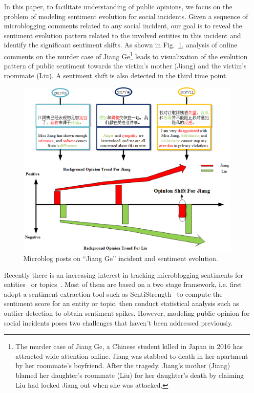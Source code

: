 \documentclass[runningheads]{llncs}
\begin{document}
In this paper, to facilitate understanding of public opinions, we focus on the problem of modeling sentiment evolution for social incidents. 
Given a sequence of microblogging comments related to any social incident, our goal is to reveal the sentiment evolution pattern related to the involved entities in this incident and identify the significant sentiment shifts. 
As shown in Fig.~\ref{fig:tweet}, analysis of online comments on the murder case of Jiang Ge\footnote{The murder case of Jiang Ge, a Chinese student killed in Japan in 2016 has attracted wide attention online. Jiang was stabbed to death in her apartment by her roommate's boyfriend. After the tragedy, Jiang's mother (Jiang) blamed her daughter's roommate (Liu) for her daughter's death by claiming Liu had locked Jiang out when she was attacked.} leads to visualization of the evolution pattern of public sentiment towards the victim's mother (Jiang) and the victim's roommate (Liu). A sentiment shift is also detected in the third time point. %

\begin{figure}
    \centering
    \includegraphics[width=1.0\textwidth,height=3.5in]{tweet.eps}
    \setlength{\abovecaptionskip}{-0.1cm}
    \caption{Microblog posts on ``Jiang Ge'' incident and sentiment evolution.}\label{fig:tweet}
\end{figure}

Recently there is an increasing interest in tracking microblogging sentiments for entities~\cite{Giachanou2016sentichange,Giachanou2017sentichange} or topics~\cite{Tsytsarau2014Topics,Thelwall2011topic}. Most of them are based on a two stage framework, i.e. first adopt a sentiment extraction tool such as SentiStrength~\cite{sentistrength2010} to compute the sentiment score for an entity or topic, then conduct statistical analysis such as outlier detection to obtain sentiment spikes. However, modeling public opinion for social incidents poses two challenges that haven't been addressed previously.
\end{document}
